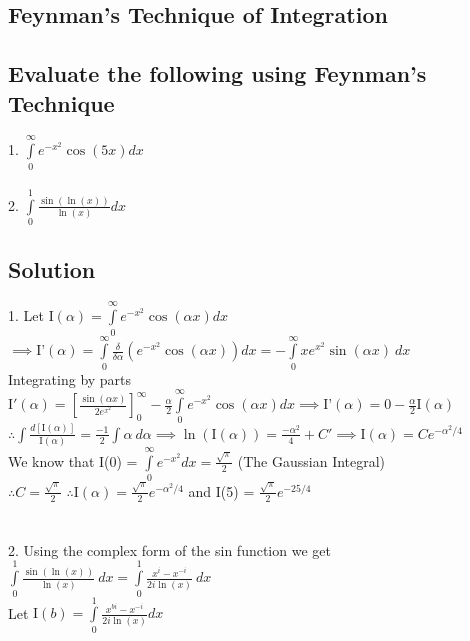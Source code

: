 \documentclass[20pt]{article}
\begin{document}
\begin{large}
	\section{Feynman's Technique of Integration}
	\subsection{Evaluate the following using Feynman's Technique}
	1. $\displaystyle \int\limits_0^\infty e^{-x^2}\cos(5x)dx$ \\ \\
	2. $\displaystyle \int\limits_0^1 \frac{\sin(\ln(x))}{\ln(x)}dx$
	\subsection{Solution}
	1. Let I$\displaystyle(\alpha) = \int\limits_0^\infty e^{-x^2}\cos(\alpha x)dx$ \\
	$\displaystyle\implies\text{I'}(\alpha) = \int\limits_0^\infty \frac{\delta}{\delta \alpha} \left(e^{-x^2}\cos(\alpha x)\right)dx = -\int\limits_0^\infty xe^{x^2}\sin(\alpha x) \ dx$ \\
	Integrating by parts \\
	$\displaystyle \text{I}'(\alpha) = \left[\frac{\sin(\alpha x)}{2e^{x^2}}\right]_0^\infty - \frac{\alpha}{2}\int\limits_0^\infty e^{-x^2}\cos(\alpha x)dx \implies \text{I'}(\alpha) = 0 - \frac{\alpha}{2}\text{I}(\alpha)$ \\
	$\displaystyle \therefore \int\frac{d\left[\text{I}(\alpha)\right]}{\text{I}(\alpha)} = \frac{-1}{2}\int \alpha \ d\alpha \implies \ln(\text{I}(\alpha)) = \frac{-\alpha^2}{4} +C' \implies \text{I}(\alpha) = Ce^{-\alpha^2/4}$ \\
	We know that I(0) = $\displaystyle \int\limits_0^\infty e^{-x^2} dx = \frac{\sqrt{\pi}}{2}$ (The Gaussian Integral) \\
	$\displaystyle \therefore C = \frac{\sqrt{\pi}}{2}$
	$\displaystyle \therefore \text{I}(\alpha) = \frac{\sqrt{\pi}}{2}e^{-\alpha^2/4}$ and I(5) = $\displaystyle \boxed{\frac{\sqrt{\pi}}{2}e^{-25/4}}$ \\ \\ \\
	2. Using the complex form of the sin function we get \\
	$\displaystyle \int\limits_0^1 \frac{\sin(\ln(x))}{\ln(x)} \ dx = \int\limits_0^1 \frac{x^i-x^{-i}}{2i\ln(x)} \ dx$ \\
	Let $\displaystyle \text{I}(b) = \int\limits_0^1\frac{x^{bi}-x^{-i}}{2i\ln(x)}dx$\\

\end{large}
\end{document}
